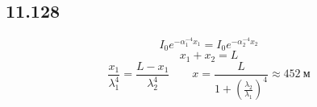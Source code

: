 \subsection*{11.128}
$$I_0 e^{-\alpha_1^{-4} x_1} = I_0 e^{-\alpha_2^{-4} x_2} $$
$$x_1 + x_2 = L$$
$$\frac{x_1}{\lambda_1^4} = \frac{L - x_1}{\lambda_2^4} \qquad x = \frac{L}{1 + (\frac{\lambda_2}{\lambda_1})^4} \approx 452 \ м$$